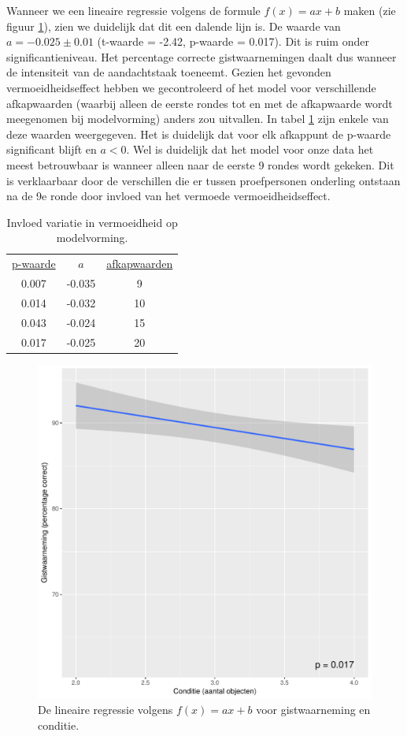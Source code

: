 \documentclass[a4paper,jou]{apa6}  %
\begin{document}
Wanneer we een lineaire regressie volgens de formule $f(x)=ax+b$ maken (zie figuur \ref{fig:lineaireRegressie}), zien we duidelijk dat dit een dalende lijn is. De waarde van $a=-0.025 \pm 0.01$ (t-waarde = -2.42, p-waarde = 0.017). Dit is ruim onder significantieniveau. Het percentage correcte gistwaarnemingen daalt dus wanneer de intensiteit van de aandachtstaak toeneemt. Gezien het gevonden vermoeidheidseffect hebben we gecontroleerd of het model voor verschillende afkapwaarden (waarbij alleen de eerste rondes tot en met de afkapwaarde wordt meegenomen bij modelvorming) anders zou uitvallen. In tabel \ref{tab:afkapwaarden} zijn enkele van deze waarden weergegeven. Het is duidelijk dat voor elk afkappunt de p-waarde significant blijft en $a<0$. Wel is duidelijk dat het model voor onze data het meest betrouwbaar is wanneer alleen naar de eerste 9 rondes wordt gekeken. Dit is verklaarbaar door de verschillen die er tussen proefpersonen onderling ontstaan na de 9e ronde door invloed van het vermoede vermoeidheidseffect.
 \begin{table}
 \caption{\label{tab:afkapwaarden}Invloed variatie in vermoeidheid op modelvorming.}
\begin{tabular}{c c c}
	\hline
    \centering
	\underline{p-waarde} & \underline{$a$} & \underline{afkapwaarden}\\
	0.007 & -0.035 & 9\\
	0.014 & -0.032 & 10\\
	0.043 & -0.024 & 15\\
	0.017 & -0.025 & 20\\
	\hline
\end{tabular}
 \end{table}
\begin{figure}
\centering
	\includegraphics[width=0.8\linewidth]{lineaireRegressie.pdf}
	\caption{\label{fig:lineaireRegressie}De lineaire regressie volgens $f(x)=a x+b$ voor gistwaarneming en conditie.}
\end{figure}
\end{document}
